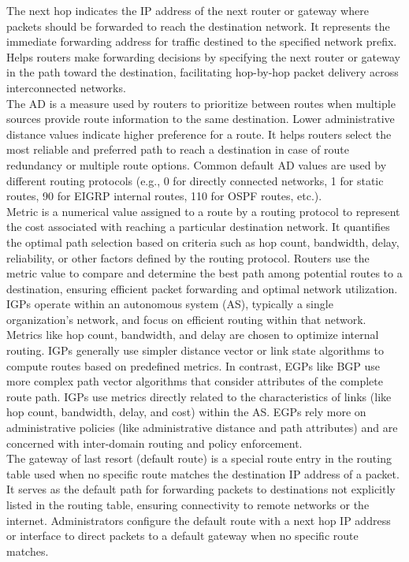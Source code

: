 \documentclass{article}
\begin{document}
	The next hop indicates the IP address of the next router or gateway where packets should be forwarded to reach the destination network. It represents the immediate forwarding address for traffic destined to the specified network prefix. Helps routers make forwarding decisions by specifying the next router or gateway in the path toward the destination, facilitating hop-by-hop packet delivery across interconnected networks.\\
	
	The AD is a measure used by routers to prioritize between routes when multiple sources provide route information to the same destination. Lower administrative distance values indicate higher preference for a route. It helps routers select the most reliable and preferred path to reach a destination in case of route redundancy or multiple route options. Common default AD values are used by different routing protocols (e.g., 0 for directly connected networks, 1 for static routes, 90 for EIGRP internal routes, 110 for OSPF routes, etc.).\\

	Metric is a numerical value assigned to a route by a routing protocol to represent the cost associated with reaching a particular destination network. It quantifies the optimal path selection based on criteria such as hop count, bandwidth, delay, reliability, or other factors defined by the routing protocol. Routers use the metric value to compare and determine the best path among potential routes to a destination, ensuring efficient packet forwarding and optimal network utilization. IGPs operate within an autonomous system (AS), typically a single organization's network, and focus on efficient routing within that network. Metrics like hop count, bandwidth, and delay are chosen to optimize internal routing. IGPs generally use simpler distance vector or link state algorithms to compute routes based on predefined metrics. In contrast, EGPs like BGP use more complex path vector algorithms that consider attributes of the complete route path. IGPs use metrics directly related to the characteristics of links (like hop count, bandwidth, delay, and cost) within the AS. EGPs rely more on administrative policies (like administrative distance and path attributes) and are concerned with inter-domain routing and policy enforcement.\\
	
	The gateway of last resort (default route) is a special route entry in the routing table used when no specific route matches the destination IP address of a packet. It serves as the default path for forwarding packets to destinations not explicitly listed in the routing table, ensuring connectivity to remote networks or the internet. Administrators configure the default route with a next hop IP address or interface to direct packets to a default gateway when no specific route matches.\\
  
\end{document}
